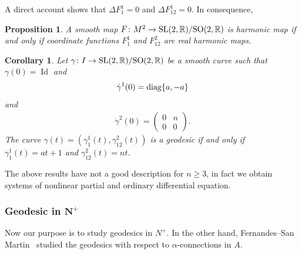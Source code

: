 \documentclass[pdftex]{sigma}
\numberwithin{equation}{section}
\newtheorem{Corollary}[Theorem]{Corollary}
\newtheorem{Proposition}[Theorem]{Proposition}
{ \theoremstyle{definition}
\newtheorem{Definition}[Theorem]{Definition}
\newtheorem{Example}[Theorem]{Example}
\newtheorem{Remark}[Theorem]{Remark}}
\begin{document}
A direct account shows that $\Delta F^1_{1} =0 $ and $\Delta F^1_{12} = 0$. In consequence,

\begin{Proposition}
  A smooth map $F\colon M^2 \rightarrow {\rm SL}(2,{\mathbb R})/{\rm SO}(2,{\mathbb R})$ is harmonic map if and only if coordinate functions $F^1_1$ and $F^2_{12}$ are real harmonic maps.
\end{Proposition}

\begin{Corollary}
  Let $\gamma\colon I \rightarrow {\rm SL}(2,{\mathbb R})/{\rm SO}(2,{\mathbb R})$ be a smooth curve such that $\gamma(0) = \operatorname{Id}$ and
  \begin{gather*}
    {\dot{\gamma}}^{1}(0) = {\rm diag}\{a,-a\}
  \end{gather*}
  and
  \begin{gather*}
    {\dot{\gamma}}^{2}(0) =
    \left(
    \begin{matrix}
      0 & n\\
      0 & 0
    \end{matrix}
    \right).
  \end{gather*}
  The curve $\gamma(t)=(\gamma^1_1(t),\gamma^2_{12}(t))$ is a geodesic if and only if $\gamma^1_1(t)= at+1$ and $\gamma^2_{12}(t) = nt$.
\end{Corollary}

The above results have not a good description for $n\geq3$, in fact we obtain systems of nonlinear partial and ordinary dif\/ferential equation.

\subsubsection[Geodesic in $N^+$]{Geodesic in $\boldsymbol{N^+}$}

Now our purpose is to study geodesics in  $N^+$. In the other hand,
Fernandes--San Martin~\cite{FernandesM/San-MartinL2} studied the
geodesics with respect to $\alpha$-connections in $A$.
\end{document}
